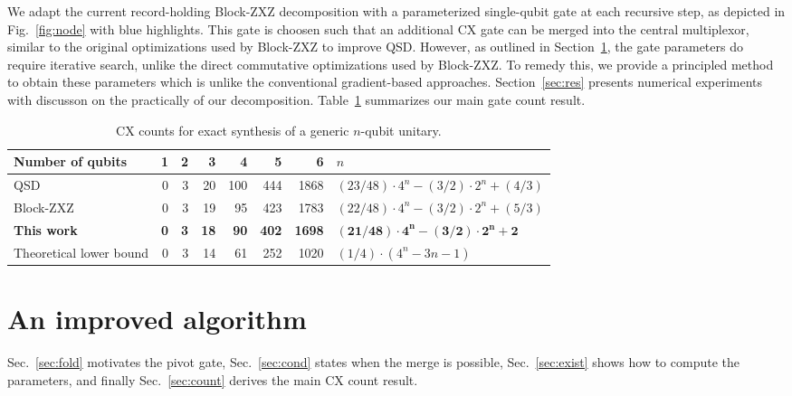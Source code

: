 \documentclass[11pt]{article}
\begin{document}
We adapt the current record-holding Block-ZXZ decomposition with a parameterized single-qubit gate at each recursive step, as depicted in Fig.~\ref{fig:node} with blue highlights. This gate is choosen such that an additional CX gate can be merged into the central multiplexor, similar to the original optimizations used by Block-ZXZ to improve QSD. However, as outlined in Section~\ref{sec:alg}, the gate parameters do require iterative search, unlike the direct commutative optimizations used by Block-ZXZ. To remedy this, we provide a principled method to obtain these parameters which is unlike the conventional gradient-based approaches. Section~\ref{sec:res} presents numerical experiments with discusson on the practically of our decomposition. Table~\ref{tab:counts} summarizes our main gate count result.

\begin{table}[!b]
\centering
\begin{tabular}{@{}lrrrrrrl@{}}
\toprule
Number of qubits & 1 & 2 & 3 & 4 & 5 & 6 & $n$\\
\midrule
QSD ~\cite{smb} & 0 & 3 & 20 & 100 & 444 & 1868 & $(23/48)\cdot4^n-(3/2)\cdot2^n+(4/3)$\\
Block-ZXZ~\cite{zxz} & 0 & 3 & 19 & 95 & 423 & 1783 & $(22/48)\cdot4^n-(3/2)\cdot2^n+(5/3)$\\
\textbf{This work} & \textbf{0} & \textbf{3} & \textbf{18} & \textbf{90} & \textbf{402} & \textbf{1698} & $\boldsymbol{(21/48)\cdot4^n-(3/2)\cdot2^n+2}$\\
\midrule
Theoretical lower bound & 0 & 3 & 14 & 61 & 252 & 1020 & $(1/4)\cdot(4^n-3n-1)$\\
\bottomrule
\end{tabular}
\caption{CX counts for exact synthesis of a generic $n$-qubit unitary.}
\label{tab:counts}
\end{table}


\section{An improved algorithm}\label{sec:alg}

Sec.~\ref{sec:fold} motivates the pivot gate, Sec.~\ref{sec:cond} states when the merge is possible,  
Sec.~\ref{sec:exist} shows how to compute the parameters, and finally Sec.~\ref{sec:count} derives the main CX count result. 
\end{document}
